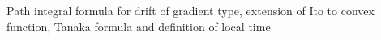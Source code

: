 Path integral formula for drift of gradient type, extension of Ito to convex function, Tanaka formula and definition of local time